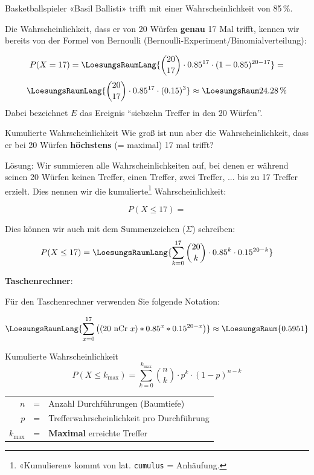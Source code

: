 Basketballspieler «Basil Ballisti» trifft mit einer
Wahrscheinlichkeit von 85\,\%.

Die Wahrscheinlichkeit, dass er von 20 Würfen \textbf{genau} 17 Mal trifft, kennen wir
bereits von der Formel von Bernoulli (Bernoulli-Experiment/Binomialverteilung):

$$P(X=17) = \LoesungsRaumLang{{20 \choose 17}\cdot 0.85^{17}\cdot(1-0.85)^{20-17}}=$$
$$\LoesungsRaumLang{{20 \choose 17}\cdot 0.85^{17}\cdot (0.15)^{3}}\approx{}\LoesungsRaum{24.28\,\%}$$
Dabei bezeichnet $E$ das Ereignis ``siebzehn Treffer in den 20 Würfen''.

\begin{beispiel}{Kumulierte Wahrscheinlichkeit}{}
Wie groß ist nun aber die Wahrscheinlichkeit, dass er bei 20 Würfen
\textbf{höchstens} (= maximal)  17 mal trifft?
\end{beispiel}


Lösung: Wir summieren alle Wahrscheinlichkeiten auf, bei denen er
während seinen 20 Würfen
keinen Treffer, einen Treffer, zwei Treffer, ... bis zu 17 Treffer
erzielt. Dies nennen wir die kumulierte\footnote{«Kumulieren» kommt von
  lat. \texttt{cumulus} = Anhäufung.} Wahrscheinlichkeit:

$$P(X\le 17) = $$

Dies können wir auch mit dem Summenzeichen ($\Sigma$) schreiben:
$$P(X\le 17) = \LoesungsRaumLang{\sum_{k=0}^{17} {20 \choose k} \cdot 0.85^k \cdot 0.15^{20-k}}$$

\newpage
\textbf{Taschenrechner}:

\leserluft

Für den Taschenrechner verwenden Sie folgende Notation: 

$$\LoesungsRaumLang{\sum_{x=0}^{17}\left(( 20 \text{\,\,nCr\,\,} x ) * 0.85^x *
0.15^{20-x}\right)} \approx \LoesungsRaum{0.5951}$$




\begin{gesetz}{Kumulierte Wahrscheinlichkeit}{}
  $$P(X \le k_{\text{max}}) = \sum_{k=0}^{k_{\text{max}}} {n \choose k} \cdot{} p^k \cdot{} (1-p)^{n-k}$$


\begin{tabular}{rcl}
  $n$ &=& Anzahl Durchführungen (Baumtiefe)\\
  $p$ &=& Trefferwahrscheinlichkeit pro Durchführung\\
  $k_{\text{max}}$ &=& \textbf{Maximal} erreichte Treffer\\
\end{tabular}
\end{gesetz}


